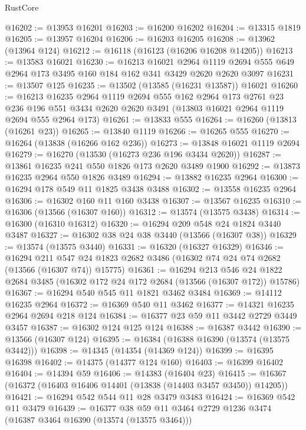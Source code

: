 \begin{lexlean}{RustCore}
\begin{coremodule}
@16202 := @13953 @16201
@16203 := @16200 @16202
@16204 := @13315 @1819
@16205 := @13957 @16204
@16206 := @16203 @16205
@16208 := @13962 (@13964 @124)
@16212 := @16118 (@16123 (@16206 @16208 @14205))
@16213 := @13583 @16021
@16230 := @16213
    @16021
    @2964
    @1119
    @2694
    @555
    @649
    @2964
    @173
    @3495
    @160
    @184
    @162
    @341
    @3429
    @2620
    @2620
    @3097
@16231 := @13507 @125
@16235 := @13502 (@13585 (@16231 @13587)) @16021
@16260 := @16213
    @16235
    @2964
    @1119
    @2694
    @555
    @162
    @2964
    @173
    @2761
    @23
    @236
    @196
    @551
    @3434
    @2620
    @2620
    @3491
    (@13803 @16021 @2964 @1119 @2694 @555 @2964 @173)
@16261 := @13833 @555
@16264 := @16260 (@13813 (@16261 @23))
@16265 := @13840 @1119
@16266 := @16265 @555
@16270 := @16264 (@13838 (@16266 @162 @236))
@16273 := @13848 @16021 @1119 @2694
@16279 := @16270 (@13530 (@16273 @236 @196 @3434 @2620))
@16287 := @13861 @16235 @241 @550 @1826 @173 @2620 @3489 @1900
@16292 := @13873 @16235 @2964 @550 @1826 @3489
@16294 := @13882 @16235 @2964
@16300 := @16294 @178 @549 @11 @1825 @3438 @3488
@16302 := @13558 @16235 @2964
@16306 := @16302 @160 @11 @160 @3438
@16307 := @13567 @16235
@16310 := @16306 (@13566 (@16307 @160))
@16312 := @13574 (@13575 @3438)
@16314 := @16300 (@16310 @16312)
@16320 := @16294 @209 @548 @24 @1824 @3440 @3487
@16327 := @16302 @38 @24 @38 @3440 (@13566 (@16307 @38))
@16329 := @13574 (@13575 @3440)
@16331 := @16320 (@16327 @16329)
@16346 := @16294
    @211
    @547
    @24
    @1823
    @2682
    @3486
    (@16302 @74 @24 @74 @2682 (@13566 (@16307 @74)) @15775)
@16361 := @16294
    @213
    @546
    @24
    @1822
    @2684
    @3485
    (@16302 @172 @24 @172 @2684 (@13566 (@16307 @172)) @15786)
@16367 := @16294 @540 @545 @11 @1821 @3462 @3484
@16369 := @14112 @16235 @2964
@16372 := @16369 @540 @11 @3462
@16377 := @14321 @16235 @2964 @2694 @218 @124
@16384 := @16377 @23 @59 @11 @3442 @2729 @3449 @3457
@16387 := @16302 @124 @125 @124
@16388 := @16387 @3442
@16390 := @13566 (@16307 @124)
@16395 := @16384 (@16388 @16390 (@13574 (@13575 @3442)))
@16398 := @14345 (@14354 (@14369 @124))
@16399 := @16395 @16398
@16402 := @14375 (@14377 @124 @160)
@16403 := @16399 @16402
@16404 := @14394 @59
@16406 := @14383 (@16404 @23)
@16415 := @16367 (@16372 (@16403 @16406 @14401 (@13838 (@14403 @3457 @3450)) @14205))
@16421 := @16294 @542 @544 @11 @28 @3479 @3483
@16424 := @16369 @542 @11 @3479
@16439 := @16377
    @38
    @59
    @11
    @3464
    @2729
    @1236
    @3474
    (@16387 @3464 @16390 (@13574 (@13575 @3464)))

\end{coremodule}
\end{lexlean}
